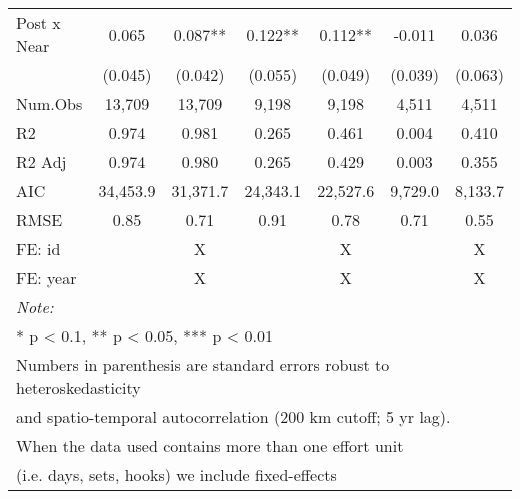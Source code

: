 \begin{table}
\begin{tabular}[t]{lcccccc}
\hline
\hspace{1em}Post x Near & 0.065 & 0.087** & 0.122** & 0.112** & -0.011 & 0.036\\
\hspace{1em} & (0.045) & (0.042) & (0.055) & (0.049) & (0.039) & (0.063)\\
\hspace{1em}Num.Obs & 13,709 & 13,709 & 9,198 & 9,198 & 4,511 & 4,511\\
\hspace{1em}R2 & 0.974 & 0.981 & 0.265 & 0.461 & 0.004 & 0.410\\
\hspace{1em}R2 Adj & 0.974 & 0.980 & 0.265 & 0.429 & 0.003 & 0.355\\
\hspace{1em}AIC & 34,453.9 & 31,371.7 & 24,343.1 & 22,527.6 & 9,729.0 & 8,133.7\\
\hspace{1em}RMSE & 0.85 & 0.71 & 0.91 & 0.78 & 0.71 & 0.55\\
\midrule
FE: id &  & X &  & X &  & X\\
FE: year &  & X &  & X &  & X\\
\midrule
\bottomrule
\multicolumn{7}{l}{\rule{0pt}{1em}\textit{Note: }}\\
\multicolumn{7}{l}{\rule{0pt}{1em}* p < 0.1, ** p < 0.05, *** p < 0.01}\\
\multicolumn{7}{l}{\rule{0pt}{1em}Numbers in parenthesis are standard errors robust to heteroskedasticity}\\
\multicolumn{7}{l}{\rule{0pt}{1em}and spatio-temporal autocorrelation (200 km cutoff; 5 yr lag).}\\
\multicolumn{7}{l}{\rule{0pt}{1em}When the data used contains more than one effort unit}\\
\multicolumn{7}{l}{\rule{0pt}{1em}(i.e. days, sets, hooks) we include fixed-effects}\\
\end{tabular}
\end{table}